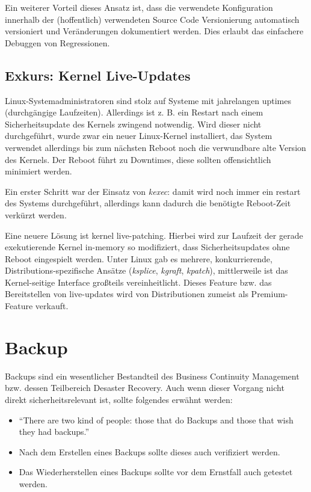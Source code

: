 Ein weiterer Vorteil dieses Ansatz ist, dass die verwendete Konfiguration innerhalb der (hoffentlich) verwendeten Source Code Versionierung automatisch versioniert und Veränderungen dokumentiert werden. Dies erlaubt das einfachere Debuggen von Regressionen.


\section{Exkurs: Kernel Live-Updates}

Linux-Systemadministratoren sind stolz auf Systeme mit jahrelangen uptimes (durchgängige Laufzeiten). Allerdings ist z. B. ein Restart nach einem Sicherheitsupdate des Kernels zwingend notwendig. Wird dieser nicht durchgeführt, wurde zwar ein neuer Linux-Kernel installiert, das System verwendet allerdings bis zum nächsten Reboot noch die verwundbare alte Version des Kernels. Der Reboot führt zu Downtimes, diese sollten offensichtlich minimiert werden.

Ein erster Schritt war der Einsatz von \textit{kexec}: damit wird noch immer ein restart des Systems durchgeführt, allerdings kann dadurch die benötigte Reboot-Zeit verkürzt werden.

Eine neuere Lösung ist kernel live-patching. Hierbei wird zur Laufzeit der gerade exekutierende Kernel in-memory so modifiziert, dass Sicherheitsupdates ohne Reboot eingespielt werden. Unter Linux gab es mehrere, konkurrierende, Distributions-spezifische Ansätze (\textit{ksplice}, \textit{kgraft}, \textit{kpatch}), mittlerweile ist das Kernel-seitige Interface großteils vereinheitlicht. Dieses Feature bzw. das Bereitstellen von live-updates wird von Distributionen zumeist als Premium-Feature verkauft.

\chapter{Backup}

Backups sind ein wesentlicher Bestandteil des Business Continuity Management bzw. dessen Teilbereich Desaster Recovery. Auch wenn dieser Vorgang nicht direkt sicherheitsrelevant ist, sollte folgendes erwähnt werden:

\begin{itemize}
	\item ``There are two kind of people: those that do Backups and those that wish they had backups.''
	\item Nach dem Erstellen eines Backups sollte dieses auch verifiziert werden.
	\item Das Wiederherstellen eines Backups sollte vor dem Ernstfall auch getestet werden.
\end{itemize}

